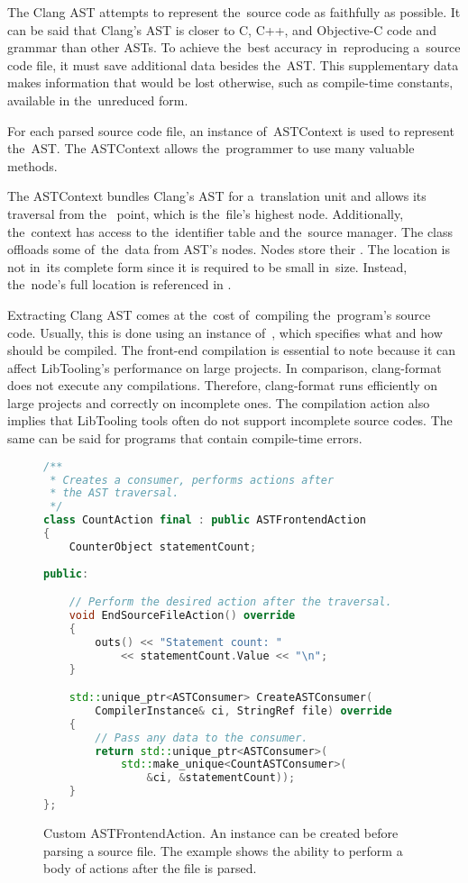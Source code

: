 The Clang AST attempts to represent the~source code as faithfully 
as possible. 
It can be said that Clang's AST is closer to C, C++, 
and Objective-C code and grammar than other ASTs. 
To achieve the~best accuracy in~reproducing a~source code file, 
it must save additional data besides the~AST. 
This supplementary data makes information that would be lost 
otherwise, such as compile-time constants, available 
in the~unreduced form. 

For each parsed source code file, an instance of~ASTContext 
is used to represent the~AST. 
The ASTContext allows the~programmer to use many valuable methods. 


The ASTContext bundles Clang's AST for a~translation unit 
and allows its traversal from the~
point, which is the~file's highest node. 
Additionally, the~context has access to the~identifier table 
and the~source manager. 
The  class offloads some of~the~data 
from AST's nodes. 
Nodes store their . 
The location is not in~its complete form since it is required 
to be small in~size. 
Instead, the~node's full location is referenced 
in .

Extracting Clang AST comes at the~cost of~compiling the~program's
source code. 
Usually, this is done using an instance of~, 
which specifies what and how should be compiled. 
The front-end compilation is essential to note because it can affect 
LibTooling's performance on large projects. 
In comparison, clang-format does not execute any compilations. 
Therefore, clang-format runs efficiently on large projects 
and correctly on incomplete ones. 
The compilation action also implies that LibTooling tools often 
do not support incomplete source codes. 
The same can be said for programs that contain compile-time errors.

\begin{figure}[h]\centering
\begin{lstlisting}[language=C++]
/**
 * Creates a consumer, performs actions after 
 * the AST traversal.
 */
class CountAction final : public ASTFrontendAction
{
	CounterObject statementCount;
	
public:

	// Perform the desired action after the traversal.
	void EndSourceFileAction() override
	{
		outs() << "Statement count: " 
			<< statementCount.Value << "\n";
	}

	std::unique_ptr<ASTConsumer> CreateASTConsumer(
		CompilerInstance& ci, StringRef file) override
	{
		// Pass any data to the consumer.
		return std::unique_ptr<ASTConsumer>(
			std::make_unique<CountASTConsumer>(
				&ci, &statementCount));
	}
};
\end{lstlisting}
\caption{Custom ASTFrontendAction. An instance can be created before
parsing a source file. The example shows the ability to perform
a body of actions after the file is parsed.}
\label{lst:astfrontendaction}
\end{figure}

